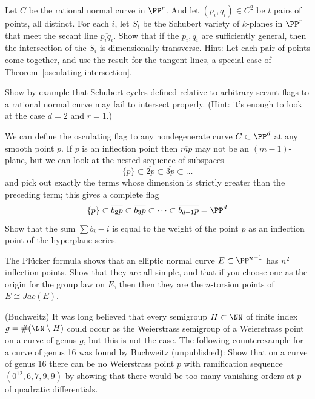 \begin{exercise}\label{independent secants}
Let $C$ be the rational normal curve in $\PP^{r}$. And let $(p_{i}, q_{i})\in  C^{2}$ be $t$ pairs of points, all distinct.
For each $i$, let $S_{i}$ be the Schubert variety of $k$-planes in $\PP^{r}$ that meet the secant line
$\overline{p_{i}q_{i}}$. Show that if the $p_{i}, q_{i}$ are sufficiently general, then the intersection
of the $S_{i}$ is dimensionally transverse. Hint: Let each pair of points come together, and use the result
for the tangent lines, a special case of Theorem~\ref{osculating intersection}.
\end{exercise}

\begin{exercise}\label{only general secants}
Show by example that Schubert cycles defined relative to arbitrary secant flags to a rational normal curve may fail to intersect properly. (Hint: it's enough to look at the case $d=2$ and $r=1$.)
\end{exercise}

\begin{exercise}
We can define the osculating flag to any nondegenerate curve $C \subset \PP^d$ at any smooth point $p$. If $p$ is an inflection point then $\overline{mp}$ may not be an $(m-1)$-plane, but we can look at the nested sequence of subspaces
$$
\{p\} \subset \overline{2p} \subset \overline{3p} \subset \dots 
$$
and pick out exactly the terms whose dimension is strictly greater than the preceding term; this gives a complete flag
$$
\{p\} \subset \overline{b_2p} \subset \overline{b_3p} \subset \dots \subset \overline{b_{d+1}p} = \PP^d
$$
Show that the sum $\sum b_i - i$ is equal to the weight of the point $p$ as an inflection point of the hyperplane series.
\end{exercise}


\begin{exercise}
The Pl\"ucker formula shows that an elliptic normal curve $E\subset \PP^{n-1}$ has $n^2$ inflection points. Show that they are
all simple, and that if you choose one as the origin for the group law on $E$, then 
then they are the $n$-torsion points of  $E \cong Jac(E)$.
\end{exercise}

\begin{exercise}(Buchweitz)
It was long believed that every semigroup $H \subset \NN$ of finite index $g = \#(\NN \setminus H)$ could occur as the Weierstrass semigroup of a Weierstrass
point on a curve of genus $g$, but this is not the case. The following counterexample for a curve of genus 16 was found by Buchweitz (unpublished): Show that on a curve of genus 16 there can be no Weierstrass point $p$ with ramification sequence
$(0^{12}, 6,7,9,9)$ by showing that there would be too many vanishing orders at $p$ of quadratic differentials.
 \end{exercise}


